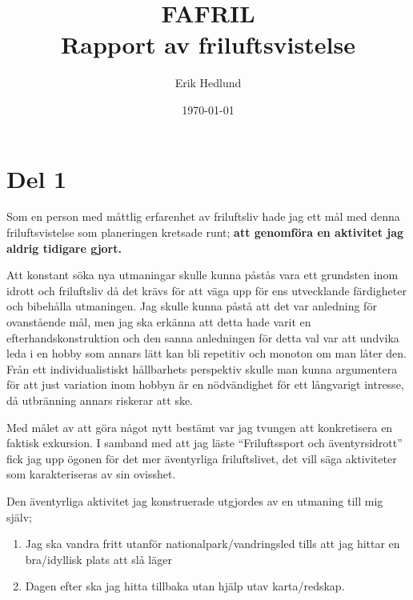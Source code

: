 \documentclass[12pt]{article}   %
\begin{document}
\onehalfspacing %

\title{%
    FAFRIL\\
    \smallskip
    \Large Rapport av friluftsvistelse
}   %
\author{Erik Hedlund}         %
\date{\today}    %
\maketitle

\section*{Del 1}

%

Som en person med måttlig erfarenhet av friluftsliv hade jag ett mål med denna
friluftsvistelse som planeringen kretsade runt; \textbf{att genomföra en aktivitet
jag aldrig tidigare gjort.}

Att konstant söka nya utmaningar skulle kunna påstås vara ett grundsten inom idrott
och friluftsliv då det krävs för att väga upp för ens utvecklande färdigheter och bibehålla
utmaningen\cite{arnegaard2006}. Jag skulle kunna påstå att det var anledning för
ovanstående mål, men jag ska erkänna att detta hade varit en efterhandskonstruktion
och den sanna anledningen för detta val var att undvika leda i en hobby som annars lätt kan bli
repetitiv och monoton om man låter den. Från ett individualistiskt hållbarhets perspektiv
skulle man kunna argumentera för att just variation inom hobbyn är en nödvändighet för
ett långvarigt intresse, då utbränning annars riskerar att ske.

Med målet av att göra något nytt bestämt var jag tvungen att konkretisera
en faktisk exkursion. I samband med att jag läste ``Friluftssport och äventyrsidrott''
fick jag upp ögonen för det mer äventyrliga friluftslivet, det vill säga aktiviteter
som karakteriseras av sin ovisshet\cite{sandell2011friluftssport}.

Den äventyrliga aktivitet jag konstruerade utgjordes av en utmaning till mig själv;

\begin{enumerate}
        \item Jag ska vandra fritt utanför nationalpark/vandringsled tills att jag hittar en bra/idyllisk plats att slå läger
        \item Dagen efter ska jag hitta tillbaka utan hjälp utav karta/redskap.
\end{enumerate}
\end{document}
